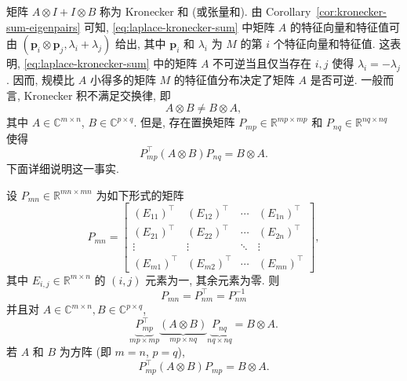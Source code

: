 {\leavevmode{}\label{idx:chapter-02-section-01:kronecker-sum-invertibility}矩阵 $A\otimes I+I\otimes B$ 称为 Kronecker 和 (或张量和). 由 Corollary\ \ref{cor:kronecker-sum-eigenpairs} 可知, \eqref{eq:laplace-kronecker-sum} 中矩阵 $A$ 的特征向量和特征值可由 $(\boldsymbol{p}_i\otimes\boldsymbol{p}_j,\lambda_i+\lambda_j)$ 给出, 其中 $\boldsymbol{p}_i$ 和 $\lambda_i$ 为 $M$ 的第 $i$ 个特征向量和特征值. 这表明, \eqref{eq:laplace-kronecker-sum} 中的矩阵 $A$ 不可逆当且仅当存在 $i,j$ 使得 $\lambda_i=-\lambda_j$. 因而, 规模比 $A$ 小得多的矩阵 $M$ 的特征值分布决定了矩阵 $A$ 是否可逆.}
{一般而言, Kronecker 积不满足交换律, 即}
\[A\otimes B\ne B\otimes A,\]
{其中 $A\in\mathbb{C}^{m\times n}$, $B\in\mathbb{C}^{p\times q}$. 但是, 存在置换矩阵 $P_{mp}\in\mathbb{R}^{mp\times mp}$ 和 $P_{nq}\in\mathbb{R}^{nq\times nq}$ 使得}
\[P_{mp}^{\top}(A\otimes B)P_{nq}=B\otimes A.\]
{下面详细说明这一事实.}
\begin{Theorem}\label{thm:kronecker-permutation}
{设 $P_{mn}\in\mathbb{R}^{mn\times mn}$ 为如下形式的矩阵}
\begin{equation}\label{eq:kronecker-commutation-matrix}
P_{mn}=\begin{bmatrix}
(E_{11})^{\top}&(E_{12})^{\top}&\cdots&(E_{1n})^{\top}\\
(E_{21})^{\top}&(E_{22})^{\top}&\cdots&(E_{2n})^{\top}\\
\vdots&\vdots&\ddots&\vdots\\
(E_{m1})^{\top}&(E_{m2})^{\top}&\cdots&(E_{mn})^{\top}
\end{bmatrix},
\end{equation}
{其中 $E_{i,j}\in\mathbb{R}^{m\times n}$ 的 $(i,j)$ 元素为一, 其余元素为零. 则}
\[P_{mn}=P_{nm}^{\top}=P_{nm}^{-1}\]
{并且对 $A\in\mathbb{C}^{m\times n},B\in\mathbb{C}^{p\times q}$,}
\begin{equation}\label{eq:kronecker-swapping-permutation}
\underbrace{P_{mp}^{\top}}_{mp\times mp}\underbrace{(A\otimes B)}_{mp\times nq}\underbrace{P_{nq}}_{nq\times nq}=B\otimes A.
\end{equation}
{若 $A$ 和 $B$ 为方阵 (即 $m=n$, $p=q$),}
\[P_{mp}^{\top}(A\otimes B)P_{mp}=B\otimes A.\]
\end{Theorem}
